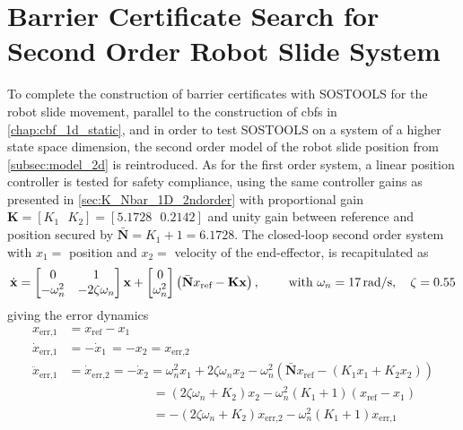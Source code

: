 
\section{Barrier Certificate Search for Second Order Robot Slide System}\label{sec:sos_2ndorder_error}

To complete the construction of barrier certificates with SOSTOOLS for the robot slide movement, parallel to the construction of \glspl{cbf} in \autoref{chap:cbf_1d_static}, and in order to test SOSTOOLS on a system of a higher state space dimension, the second order model of the robot slide position from \autoref{subsec:model_2d} is reintroduced. As for the first order system, a linear position controller is tested for safety compliance, using the same controller gains as presented in \autoref{sec:K_Nbar_1D_2ndorder} with proportional gain $\mathbf{K}=[K_1\,\,\,\,K_2]=[5.1728\,\,\,\,0.2142]$ and unity gain between reference and position secured by $\bar{\mathbf{N}}=K_1+1=6.1728$. The closed-loop second order system with $x_1=$ position and $x_2=$ velocity of the end-effector, is recapitulated as
\begin{equation}
\dot{\mathbf{x}}= 
\begin{bmatrix}
0 & 1\\
-\omega_n^2  & -2\zeta \omega_n  
\end{bmatrix}
\mathbf{x} + 
\begin{bmatrix}
0\\\omega_n^2
\end{bmatrix}\left(\bar{\mathbf{N}}x_\text{ref}-\mathbf{K}\mathbf{x}\right),
 \hspace{0.8cm} \text{with }
 \omega_n = 17 \,\text{rad/s}, \quad \zeta = 0.55
\end{equation}
giving the error dynamics
\begin{align*}
x_\text{err,1}&=x_\text{ref}-x_1\\
\dot{x}_\text{err,1} &= -\dot{x}_1 \,=-x_2=x_\text{err,2}\\
\ddot{x}_\text{err,1} &= \dot{x}_\text{err,2} = -\dot{x}_2 = \omega_n^2 x_1 +2\zeta\omega_n x_2 - \omega_n^2(\bar{\mathbf{N}}x_\text{ref}-(K_1x_1+K_2 x_2))\nonumber\\
& \phantom{= -\ddot{x}_\text{err,1} = \dot{x}_2. } = (2\zeta\omega_n +K_2)x_2 -\omega_n^2(K_1+1)(x_\text{ref}-x_1)\nonumber\\
& \phantom{= -\ddot{x}_\text{err,1} = \dot{x}_2. } = -(2\zeta\omega_n +K_2){x}_\text{err,2} - \omega_n^2(K_1+1)x_\text{err,1}
\end{align*}
